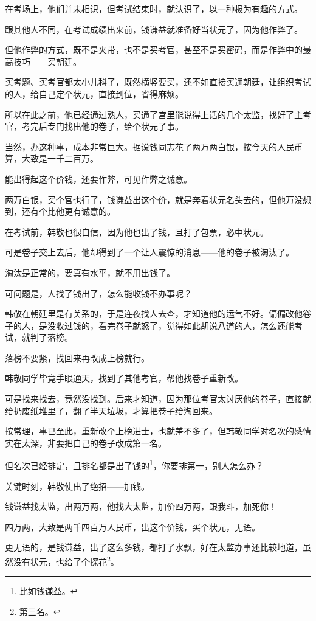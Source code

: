 \begin{multicols}{\theparacolNo}
在考场上，他们并未相识，但考试结束时，就认识了，以一种极为有趣的方式。

跟其他人不同，在考试成绩出来前，钱谦益就准备好当状元了，因为他作弊了。

但他作弊的方式，既不是夹带，也不是买考官，甚至不是买密码，而是作弊中的最高技巧——买朝廷。

买考题、买考官都太小儿科了，既然横竖要买，还不如直接买通朝廷，让组织考试的人，给自己定个状元，直接到位，省得麻烦。

所以在此之前，他已经通过熟人，买通了宫里能说得上话的几个太监，找好了主考官，考完后专门找出他的卷子，给个状元了事。

当然，办这种事，成本非常巨大。据说钱同志花了两万两白银，按今天的人民币算，大致是一千二百万。

能出得起这个价钱，还要作弊，可见作弊之诚意。

两万白银，买个官也行了，钱谦益出这个价，就是奔着状元名头去的，但他万没想到，还有个比他更有诚意的。

在考试前，韩敬也很自信，因为他也出了钱，且打了包票，必中状元。

可是卷子交上去后，他却得到了一个让人震惊的消息——他的卷子被淘汰了。

淘汰是正常的，要真有水平，就不用出钱了。

可问题是，人找了钱出了，怎么能收钱不办事呢？

韩敬在朝廷里是有关系的，于是连夜找人去查，才知道他的运气不好。偏偏改他卷子的人，是没收过钱的，看完卷子就怒了，觉得如此胡说八道的人，怎么还能考试，就判了落榜。

落榜不要紧，找回来再改成上榜就行。

韩敬同学毕竟手眼通天，找到了其他考官，帮他找卷子重新改。

可是找来找去，竟然没找到。后来才知道，因为那位考官太讨厌他的卷子，直接就给扔废纸堆里了，翻了半天垃圾，才算把卷子给淘回来。

按常理，事已至此，重新改个上榜进士，也就差不多了，但韩敬同学对名次的感情实在太深，非要把自己的卷子改成第一名。

但名次已经排定，且排名都是出了钱的\footnote{比如钱谦益。}，你要排第一，别人怎么办？

关键时刻，韩敬使出了绝招——加钱。

钱谦益找太监，出两万两，他找大太监，加价四万两，跟我斗，加死你！

四万两，大致是两千四百万人民币，出这个价钱，买个状元，无语。

更无语的，是钱谦益，出了这么多钱，都打了水飘，好在太监办事还比较地道，虽然没有状元，也给了个探花\footnote{第三名。}。


\end{multicols}
